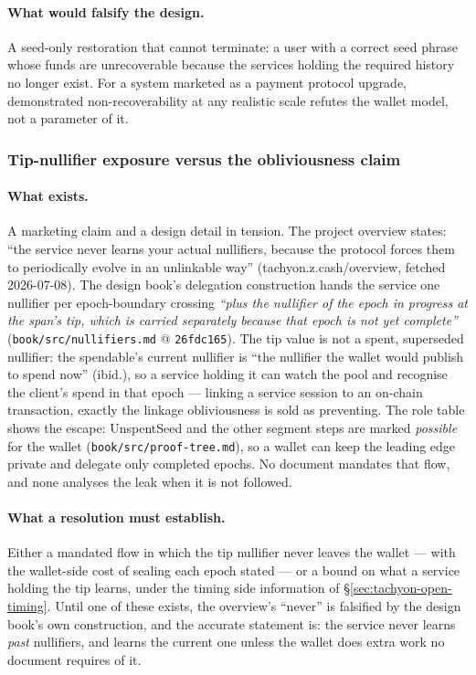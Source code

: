 \documentclass[11pt,a4paper]{article}
\theoremstyle{definition}
\begin{document}
\paragraph{What would falsify the design.} A seed-only restoration that
cannot terminate: a user with a correct seed phrase whose funds are
unrecoverable because the services holding the required history no longer
exist. For a system marketed as a payment protocol upgrade, demonstrated
non-recoverability at any realistic scale refutes the wallet model, not a
parameter of it.

\subsubsection{Tip-nullifier exposure versus the obliviousness claim}
\label{sec:tachyon-open-tip}

\paragraph{What exists.} A marketing claim and a design detail in tension.
The project overview states: ``the service never learns your actual
nullifiers, because the protocol forces them to periodically evolve in an
unlinkable way'' (tachyon.z.cash/overview, fetched 2026-07-08). The design
book's delegation construction hands the service one nullifier per
epoch-boundary crossing \emph{``plus the nullifier of the epoch in progress
at the span's tip, which is carried separately because that epoch is not
yet complete''} (\texttt{book/src/nullifiers.md} @ \texttt{26fdc165}). The
tip value is not a spent, superseded nullifier: the spendable's current
nullifier is ``the nullifier the wallet would publish to spend now''
(ibid.), so a service holding it can watch the pool and recognise the
client's spend in that epoch --- linking a service session to an on-chain
transaction, exactly the linkage obliviousness is sold as preventing. The
role table shows the escape: \textsf{UnspentSeed} and the other segment
steps are marked \emph{possible} for the wallet
(\texttt{book/src/proof-tree.md}), so a wallet can keep the leading edge
private and delegate only completed epochs. No document mandates that flow,
and none analyses the leak when it is not followed.

\paragraph{What a resolution must establish.} Either a mandated flow in
which the tip nullifier never leaves the wallet --- with the wallet-side
cost of sealing each epoch stated --- or a bound on what a service holding
the tip learns, under the timing side information of
\S\ref{sec:tachyon-open-timing}. Until one of these exists, the overview's
``never'' is falsified by the design book's own construction, and the
accurate statement is: the service never learns \emph{past} nullifiers,
and learns the current one unless the wallet does extra work no document
requires of it.
\end{document}

